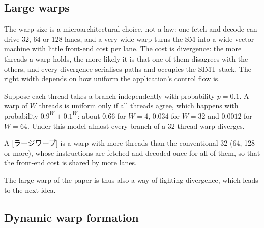 \documentclass[../main.tex]{subfiles}
\begin{document}
\subsection{Large warps}

The warp size is a microarchitectural choice, not a law: one fetch and
decode can drive 32, 64 or 128 lanes, and a very wide warp turns the SM
into a wide vector machine with little front-end cost per
lane.  The cost
is divergence: the more threads a warp holds, the more likely it is
that one of them disagrees with the others, and every divergence
serialises paths and occupies the SIMT stack.  The right width depends
on how uniform the application's control flow is.

\begin{example}
  \label{ex:l06-large-warp}
  Suppose each thread takes a branch independently with probability
  $p = 0.1$.  A warp of $W$ threads is uniform only if all threads
  agree, which happens with probability $0.9^W + 0.1^W$: about
  $0.66$ for $W = 4$, $0.034$ for $W = 32$ and $0.0012$ for $W = 64$.
  Under this model almost every branch of a 32-thread warp
  diverges.
\end{example}

\begin{definition}
  \label{def:l06-large-warp}
  A [ラージワープ] is a warp with more threads than
  the conventional 32 (64, 128 or more), whose instructions are
  fetched and decoded once for all of them, so that the front-end cost
  is shared by more lanes.
\end{definition}

%
The large warp of the paper is thus also a way of fighting divergence,
which leads to the next idea.

\subsection{Dynamic warp formation}
\end{document}
